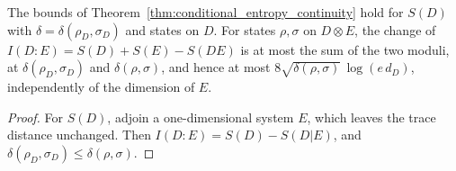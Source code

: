 \begin{corollary}
    \label{cor:entropy_mutual_information_continuity}
    \leanok
    The bounds of Theorem~\ref{thm:conditional_entropy_continuity} hold for
    $S(D)$ with $\delta=\delta(\rho_D,\sigma_D)$ and states on $D$. For states
    $\rho,\sigma$ on $D\otimes E$, the change of
    $I(D:E)=S(D)+S(E)-S(DE)$ is at most the sum of the two moduli, at
    $\delta(\rho_D,\sigma_D)$ and $\delta(\rho,\sigma)$, and hence at most
    $8\sqrt{\delta(\rho,\sigma)}\,\log(e\,d_D)$, independently of the
    dimension of $E$.
\end{corollary}

\begin{proof}\leanok
    For $S(D)$, adjoin a one-dimensional system $E$, which leaves the trace
    distance unchanged. Then $I(D:E)=S(D)-S(D|E)$, and
    $\delta(\rho_D,\sigma_D)\le\delta(\rho,\sigma)$.
\end{proof}
